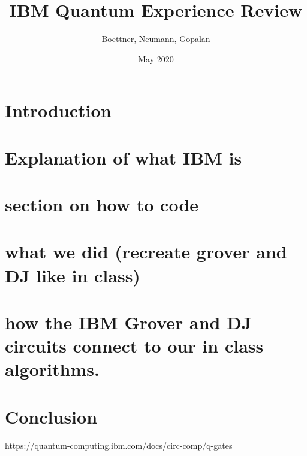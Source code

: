 \documentclass{article}
\title{IBM Quantum Experience Review}
\author{Boettner, Neumann, Gopalan }
\date{May 2020}
\begin{document}
\maketitle

\section{Introduction}
\section{Explanation of what IBM is}
\section{section on how to code}
    
        

\section{what we did (recreate grover and DJ like in class)}
\section{how the IBM Grover and DJ circuits connect to our in class algorithms.}
\section{Conclusion}
https://quantum-computing.ibm.com/docs/circ-comp/q-gates
\end{document}
